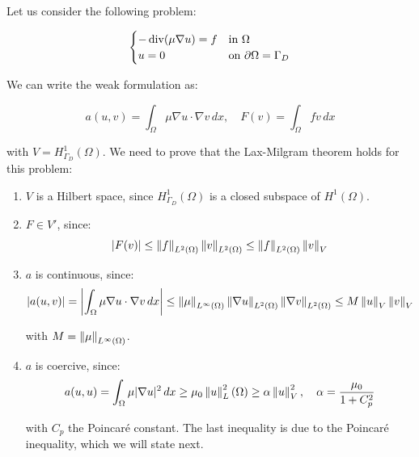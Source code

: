 \begin{example}
    Let us consider the following problem:

    \begin{equation}
        \begin{cases}
            -\operatorname{div}(\mu \nabla u) = f & \text{in } \Omega \\
            u = 0 & \text{on } \partial \Omega = \Gamma_D \\
        \end{cases}
    \end{equation}

    We can write the weak formulation as:

    $$a(u, v) = \int_{\Omega} \mu \nabla u \cdot \nabla v \, dx, \quad F(v) = \int_{\Omega} f v \, dx$$

    with $V = H_{\Gamma_D}^1(\Omega)$. We need to prove that the Lax-Milgram theorem holds for this problem:\\

    \begin{enumerate}[label=(\roman*)]
        \item $V$ is a Hilbert space, since $H_{\Gamma_D}^1(\Omega)$ is a closed subspace of $H^1(\Omega)$.
        
        \item $F \in V'$, since:
        $$|F(v)| \leq \left\|f\right\|_{L^2(\Omega)} \left\|v\right\|_{L^2(\Omega)} \leq \left\|f\right\|_{L^2(\Omega)} \left\|v\right\|_V$$

        \item $a$ is continuous, since:
        $$|a(u, v)| = \left| \int_{\Omega} \mu \nabla u \cdot \nabla v \, dx \right| \leq \left\|\mu\right\|_{L^{\infty}(\Omega)} \left\|\nabla u\right\|_{L^2(\Omega)} \left\|\nabla v\right\|_{L^2(\Omega)} \leq M \left\|u\right\|_V \left\|v\right\|_V$$

        with $M = \left\|\mu\right\|_{L^{\infty}(\Omega)}$.

        \item $a$ is coercive, since:
        $$a(u, u) = \int_{\Omega} \mu |\nabla u|^2 \, dx \geq \mu_0 \left\|u\right\|_L^2(\Omega) \geq \alpha \left\|u\right\|_V^2, 
        \quad \alpha = \frac{\mu_0}{1 + C_p^2}$$

        with $C_p$ the Poincaré constant. The last inequality is due to the Poincaré inequality,
        which we will state next.
    \end{enumerate}
    
\end{example}

